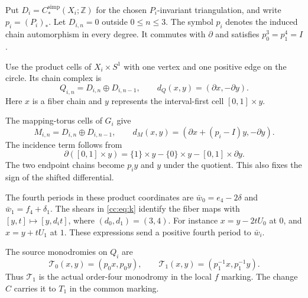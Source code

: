 Put $D_i=C_*^{\mathrm{simp}}(X_i;\mathbb Z)$ for the chosen
$P_i$-invariant triangulation, and write $p_i=(P_i)_*$.
Let $D_{i,n}=0$ outside $0\leq n\leq3$.
The symbol $p_i$ denotes the induced chain automorphism in every degree.
It commutes with $\partial$ and satisfies $p_0^3=p_1^4=I$.

Use the product cells of $X_i\times S^1$ with one vertex and one
positive edge on the circle. Its chain complex is
\begin{equation}\label{cc:eq:product-carrier}
Q_{i,n}=D_{i,n}\oplus D_{i,n-1},\qquad
d_Q(x,y)=(\partial x,-\partial y).
\end{equation}
Here $x$ is a fiber chain and $y$ represents the interval-first cell
$[0,1]\times y$.

The mapping-torus cells of $G_i$ give
\begin{equation}\label{cc:eq:torus-carrier}
M_{i,n}=D_{i,n}\oplus D_{i,n-1},\qquad
d_M(x,y)=(\partial x+(p_i-I)y,-\partial y).
\end{equation}
The incidence term follows from
\[
\partial([0,1]\times y)=\{1\}\times y-\{0\}\times y
 -[0,1]\times\partial y.
\]
The two endpoint chains become $p_i y$ and $y$ under the quotient.
This also fixes the sign of the shifted differential.

The fourth periods in these product coordinates are
$\bar w_0=e_4-2\delta$ and $\bar w_1=f_4+\delta_1$.
The shears in \eqref{cc:eq:k} identify the fiber maps with
$[y,t]\mapsto[y,d_i t]$, where $(d_0,d_1)=(3,4)$.
For instance $x=y-2tU_0$ at $0$, and $x=y+tU_1$ at $1$.
These expressions send a positive fourth period to $\bar w_i$.

The source monodromies on $Q_i$ are
\[
\mathcal T_0(x,y)=(p_0x,p_0y),\qquad
\mathcal T_1(x,y)=(p_1^{-1}x,p_1^{-1}y).
\]
Thus $\mathcal T_1$ is the actual order-four monodromy in the local
$f$ marking. The change $C$ carries it to $T_1$ in the common marking.

